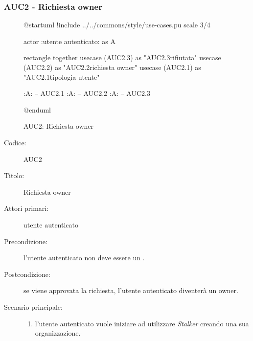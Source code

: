 \documentclass[casi-duso]{subfiles}
\begin{document}
\subsubsection{AUC2 - Richiesta owner}%
\label{subsub:AUC2}

\begin{figure}[h!] 
  \centering 
  \begin{plantuml}
  @startuml
  !include ../../commons/style/use-cases.pu
  scale 3/4

  actor :utente autenticato: as A

  rectangle {
    together {
      usecase (AUC2.3) as "AUC2.3\nRichiesta rifiutata"
      usecase (AUC2.2) as "AUC2.2\nInvio richiesta owner"
      usecase (AUC2.1) as "AUC2.1\nVerifica tipologia utente"
    }
  }

  :A: -- AUC2.1
  :A: -- AUC2.2
  :A: -- AUC2.3

  @enduml
  \end{plantuml} 
  \caption{AUC2: Richiesta owner} 
  \label{fig:auc2} 
\end{figure}

\begin{description}
  \item[Codice:] AUC2
  \item[Titolo:] Richiesta owner
  \item[Attori primari:] utente autenticato
  \item[Precondizione:] l'utente autenticato non deve essere un .
  \item[Postcondizione:] se viene approvata la richiesta, l'utente autenticato diventerà un owner.
  \item[Scenario principale:]
  \begin{enumerate}
    \item l'utente autenticato vuole iniziare ad utilizzare \emph{Stalker} creando una sua organizzazione.
  \end{enumerate}
\end{description}
\end{document}
